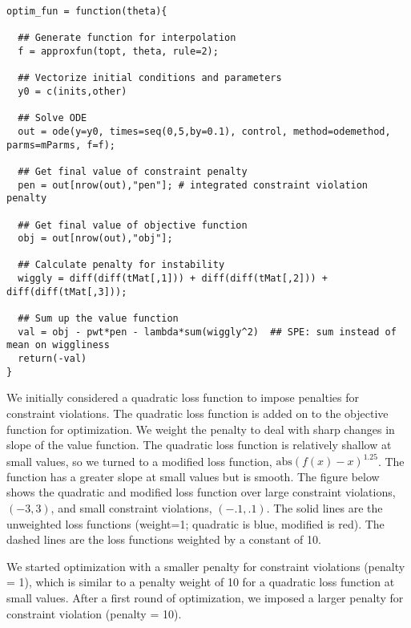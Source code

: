 \documentclass[12pt, oneside]{article}   	%
\begin{document}
\begin{lstlisting}
optim_fun = function(theta){
  
  ## Generate function for interpolation
  f = approxfun(topt, theta, rule=2);
  
  ## Vectorize initial conditions and parameters
  y0 = c(inits,other) 
  
  ## Solve ODE
  out = ode(y=y0, times=seq(0,5,by=0.1), control, method=odemethod, parms=mParms, f=f);
  
  ## Get final value of constraint penalty
  pen = out[nrow(out),"pen"]; # integrated constraint violation penalty 
  
  ## Get final value of objective function
  obj = out[nrow(out),"obj"]; 
  
  ## Calculate penalty for instability
  wiggly = diff(diff(tMat[,1])) + diff(diff(tMat[,2])) + diff(diff(tMat[,3])); 
  
  ## Sum up the value function
  val = obj - pwt*pen - lambda*sum(wiggly^2)  ## SPE: sum instead of mean on wiggliness
  return(-val)
}
\end{lstlisting}

We initially considered a quadratic loss function to impose penalties for constraint violations. The quadratic loss function is added on to the objective function for optimization. We weight the penalty to deal with sharp changes in slope of the value function. The quadratic loss function is relatively shallow at small values, so we turned to a modified loss function, $\mathrm{abs}( f(x) - x )^{1.25} $. The function has a greater slope at small values but is smooth. The figure below shows the quadratic and modified loss function over large constraint violations, $(-3,3)$, and small constraint violations, $(-.1,.1)$. The solid lines are the unweighted loss functions (weight=1; quadratic is blue, modified is red). The dashed lines are the loss functions weighted by a constant of 10. 

We started optimization with a smaller penalty for constraint violations (penalty = 1), which is similar to a penalty weight of 10 for a quadratic loss function at small values. After a first round of optimization, we imposed a larger penalty for constraint violation (penalty = 10).


\end{document}
